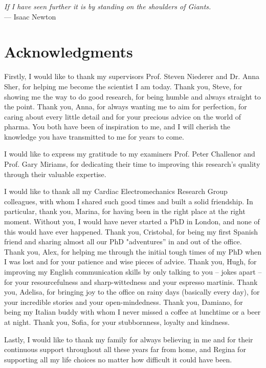 
\begin{flushright}{\slshape
    If I have seen further it is by standing on the shoulders of Giants.} \\ \medskip
    --- Isaac Newton
\end{flushright}

\bigskip

\begingroup
\let\clearpage\relax
\let\cleardoublepage\relax
\let\cleardoublepage\relax
\chapter*{Acknowledgments}
Firstly, I would like to thank my supervisors Prof. Steven Niederer and Dr. Anna Sher, for helping me become the scientist I am today. Thank you, Steve, for showing me the way to do good research, for being humble and always straight to the point. Thank you, Anna, for always wanting me to aim for perfection, for caring about every little detail and for your precious advice on the world of pharma. You both have been of inspiration to me, and I will cherish the knowledge you have transmitted to me for years to come.

\vspace{0.2cm}
I would like to express my gratitude to my examiners Prof. Peter Challenor and Prof. Gary Miriams, for dedicating their time to improving this research's quality through their valuable expertise.

\vspace{0.2cm}
I would like to thank all my Cardiac Electromechanics Research Group colleagues, with whom I shared such good times and built a solid friendship. In particular, thank you, Marina, for having been in the right place at the right moment. Without you, I would have never started a PhD in London, and none of this would have ever happened. Thank you, Cristobal, for being my first Spanish friend and sharing almost all our PhD "adventures'' in and out of the office. Thank you, Alex, for helping me through the initial tough times of my PhD when I was lost and for your patience and wise pieces of advice. Thank you, Hugh, for improving my English communication skills by only talking to you -- jokes apart -- for your resourcefulness and sharp-wittedness and your espresso martinis. Thank you, Adelisa, for bringing joy to the office on rainy days (basically every day), for your incredible stories and your open-mindedness. Thank you, Damiano, for being my Italian buddy with whom I never missed a coffee at lunchtime or a beer at night. Thank you, Sofia, for your stubbornness, loyalty and kindness.

\vspace{0.2cm}
Lastly, I would like to thank my family for always believing in me and for their continuous support throughout all these years far from home, and Regina for supporting all my life choices no matter how difficult it could have been.

\endgroup